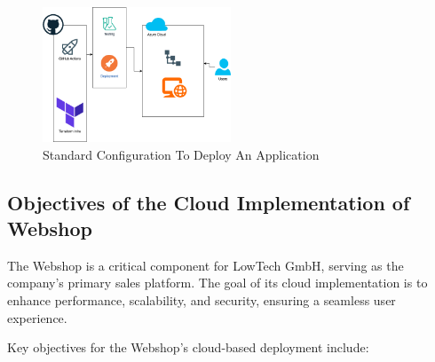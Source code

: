 \documentclass{llncs}
\begin{document}
\begin{figure}[htbp]
    \begin{center}
        \includegraphics[width=0.5\textwidth]{../diagrams/AppStandard.drawio.png}
        \vspace{0.01\textwidth}
        \caption{Standard Configuration To Deploy An Application}
        \label{CloudStandard} %
    \end{center}
\end{figure}


\subsection{Objectives of the Cloud Implementation of Webshop}

The Webshop is a critical component for LowTech GmbH, serving as the company’s primary sales platform. The goal of its cloud implementation is to enhance performance, scalability, and security, ensuring a seamless user experience.

Key objectives for the Webshop's cloud-based deployment include:
\end{document}
